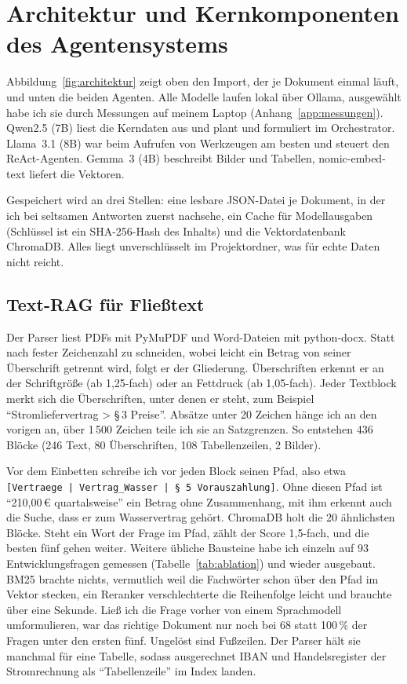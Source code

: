 
\chapter{Architektur und Kernkomponenten des Agentensystems}
\label{chap:architektur}

Abbildung~\ref{fig:architektur} zeigt oben den Import, der je Dokument einmal läuft, und unten die beiden Agenten. Alle Modelle laufen lokal über Ollama, ausgewählt habe ich sie durch Messungen auf meinem Laptop (Anhang~\ref{app:messungen}). Qwen2.5 (7B) liest die Kerndaten aus und plant und formuliert im Orchestrator. Llama~3.1 (8B) war beim Aufrufen von Werkzeugen am besten und steuert den ReAct-Agenten. Gemma~3 (4B) beschreibt Bilder und Tabellen, nomic-embed-text liefert die Vektoren.

Gespeichert wird an drei Stellen: eine lesbare JSON-Datei je Dokument, in der ich bei seltsamen Antworten zuerst nachsehe, ein Cache für Modellausgaben (Schlüssel ist ein SHA-256-Hash des Inhalts) und die Vektordatenbank ChromaDB. Alles liegt unverschlüsselt im Projektordner, was für echte Daten nicht reicht.



\section{Text-RAG für Fließtext}
\label{sec:textrag}

Der Parser liest PDFs mit PyMuPDF und Word-Dateien mit python-docx. Statt nach fester Zeichenzahl zu schneiden, wobei leicht ein Betrag von seiner Überschrift getrennt wird, folgt er der Gliederung. Überschriften erkennt er an der Schriftgröße (ab 1,25-fach) oder an Fettdruck (ab 1,05-fach). Jeder Textblock merkt sich die Überschriften, unter denen er steht, zum Beispiel \enquote{Stromliefervertrag > §\,3 Preise}. Absätze unter 20 Zeichen hänge ich an den vorigen an, über 1\,500 Zeichen teile ich sie an Satzgrenzen. So entstehen 436 Blöcke (246 Text, 80 Überschriften, 108 Tabellenzeilen, 2 Bilder).

Vor dem Einbetten schreibe ich vor jeden Block seinen Pfad, also etwa \texttt{[Vertraege | Vertrag\_Wasser | §\,5 Vorauszahlung]}. Ohne diesen Pfad ist \enquote{210,00\,€ quartalsweise} ein Betrag ohne Zusammenhang, mit ihm erkennt auch die Suche, dass er zum Wasservertrag gehört. ChromaDB holt die 20 ähnlichsten Blöcke. Steht ein Wort der Frage im Pfad, zählt der Score 1,5-fach, und die besten fünf gehen weiter. Weitere übliche Bausteine habe ich einzeln auf 93 Entwicklungsfragen gemessen (Tabelle~\ref{tab:ablation}) und wieder ausgebaut. BM25 brachte nichts, vermutlich weil die Fachwörter schon über den Pfad im Vektor stecken, ein Reranker verschlechterte die Reihenfolge leicht und brauchte über eine Sekunde. Ließ ich die Frage vorher von einem Sprachmodell umformulieren, war das richtige Dokument nur noch bei 68 statt 100\,\% der Fragen unter den ersten fünf. Ungelöst sind Fußzeilen. Der Parser hält sie manchmal für eine Tabelle, sodass ausgerechnet IBAN und Handelsregister der Stromrechnung als \enquote{Tabellenzeile} im Index landen.

